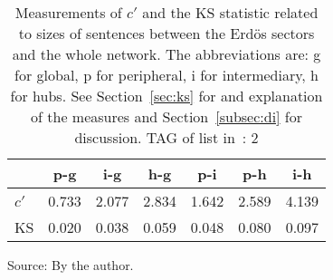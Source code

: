 \begin{table}[h!]
\begin{center}
\caption{Measurements of $c'$ and the KS statistic related to sizes of sentences between the Erd\"os sectors and the whole network. The abbreviations are: g for global, p for peripheral, i for intermediary, h for hubs. See Section~\ref{sec:ks} for and explanation of the measures and Section~\ref{subsec:di} for discussion. TAG of list in~\cite{textTables}: 2}
\begin{tabular}{| l || c | c | c | c | c | c |}\hline
{\bf } & {\bf p-g} & {\bf i-g} & {\bf h-g} & {\bf p-i} & {\bf p-h} & {\bf i-h} \\\hline\hline
$c'$ & 0.733  & 2.077  & 2.834  & 1.642  & 2.589  & 4.139 \\
KS & 0.020  & 0.038  & 0.059  & 0.048  & 0.080  & 0.097 \\\hline
\end{tabular}
\begin{flushleft}\footnotesize
Source: By the author.\
\end{flushleft}
\end{center}
\end{table}
